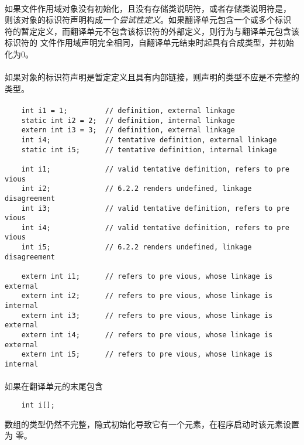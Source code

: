 \paragraph{}
如果文件作用域对象没有初始化，且没有存储类说明符，或者存储类说明符是，
则该对象的标识符声明构成一个\textit{尝试性定义}。如果翻译单元包含一个或多个标识
符的暂定定义，而翻译单元不包含该标识符的外部定义，则行为与翻译单元包含该标识符的
文件作用域声明完全相同，自翻译单元结束时起具有合成类型，并初始化为0。

\paragraph{}
如果对象的标识符声明是暂定定义且具有内部链接，则声明的类型不应是不完整的类型。

\paragraph{}
\ex
\begin{lstlisting}
    int i1 = 1;         // definition, external linkage
    static int i2 = 2;  // definition, internal linkage
    extern int i3 = 3;  // definition, external linkage
    int i4;             // tentative definition, external linkage
    static int i5;      // tentative definition, internal linkage

    int i1;             // valid tentative definition, refers to pre vious
    int i2;             // 6.2.2 renders undefined, linkage disagreement
    int i3;             // valid tentative definition, refers to pre vious
    int i4;             // valid tentative definition, refers to pre vious
    int i5;             // 6.2.2 renders undefined, linkage disagreement

    extern int i1;      // refers to pre vious, whose linkage is external
    extern int i2;      // refers to pre vious, whose linkage is internal
    extern int i3;      // refers to pre vious, whose linkage is external
    extern int i4;      // refers to pre vious, whose linkage is external
    extern int i5;      // refers to pre vious, whose linkage is internal
\end{lstlisting}

\paragraph{}
\ex 如果在翻译单元的末尾包含
\begin{lstlisting}
    int i[];
\end{lstlisting}
数组的类型仍然不完整，隐式初始化导致它有一个元素，在程序启动时该元素设置为
零。

